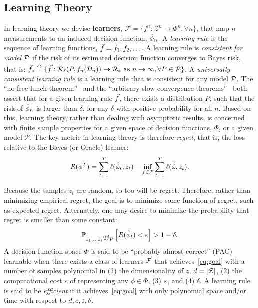 \documentclass{article}
\begin{document}
\subsection{Learning Theory}

In learning theory we devise  \textbf{learners}, $\mathcal{F} = \{f^n : \mathcal{Z}^n \to \Phi^n, \forall n\}$, that map $n$ measurements to an induced decision function, $\hat{\phi}_n$. 
A \emph{learning rule} is the sequence of learning functions, $\vec{f}= f_1,f_2,\ldots$.  A learning rule is \emph{consistent for model $\mathcal{P}$} if the risk of its estimated decision function converges to Bayes risk, that is:
$\vec{f}_* \overset{\triangle}{=} \{ \vec{f} : \mathcal{R}_\ell(P,f_n(\mathcal{D}_n)) \to \mathcal{R}_* \text{ as } n \rightarrow \infty, \forall P \in \mathcal{P} \}$.
A \emph{universally consistent learning rule} is a learning rule that is consistent for any model $\mathcal{P}$. 
%
The ``no free lunch theorem''~\cite{Wolpert1996} and the ``arbitrary slow convergence theorems''~\cite{Devroye1993} both assert that for a given learning rule $\vec{f}$, there exists a distribution $P$, such that the risk of $\hat{\phi}_n$ is larger than $\delta$, for any $\delta$ with positive probability for all $n$.   Based on this,   learning theory, rather than dealing with asymptotic results, is concerned with finite sample properties for a given space of decision functions, $\Phi$, or a given model $\mathcal{P}$. 
The key metric in  learning theory is therefore \emph{regret}, that is, the loss relative to the Bayes (or Oracle) learner:
\begin{align}
    R(\phi^T) = \sum_{t=1}^T \ell(\hat{\phi}_t, z_t) - \inf_{f \in \mathcal{F}} \sum_{t=1}^T \ell ( \hat{\phi}, z_t).
\end{align}

Because the samples $z_t$ are random, so too will be regret.  Therefore, rather than minimizing empirical regret, the goal is to minimize some function of regret, such as expected regret. 
% 
Alternately, one may desire to minimize the probability that regret is smaller than some constant:
\begin{align} \label{eq:goal}
    \mathbb{P}_{ z_1,\ldots z_t \overset{iid}{\sim} P} \left[R(\hat{\phi}_t)  < \varepsilon \right] > 1 - \delta.
\end{align}
A decision function space $\Phi$ is said to be ``probably almost correct'' (PAC) learnable when there exists a class of learners $\mathcal{F}$ that achieves~\eqref{eq:goal} with a  number of samples polynomial in (1) the dimensionality of $z$, $d=|\mathcal{Z}|$, (2) the computational cost $c$ of representing any $\phi \in \Phi$, (3) $\varepsilon$, and  (4) $\delta$.  A learning rule is said to be \emph{efficient} if it achieves~\eqref{eq:goal} with only polynomial space and/or time with respect to $d,c,\varepsilon,\delta$.  
\end{document}
